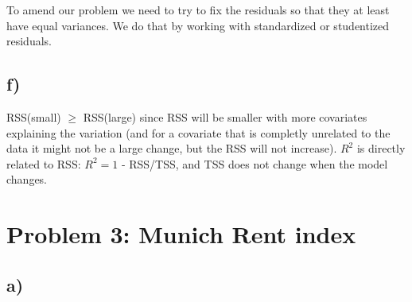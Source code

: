 \documentclass[]{article}
\newenvironment{Shaded}{\begin{snugshade}}{\end{snugshade}}
\newcommand{\KeywordTok}[1]{\textcolor[rgb]{0.13,0.29,0.53}{\textbf{#1}}}
\newcommand{\DataTypeTok}[1]{\textcolor[rgb]{0.13,0.29,0.53}{#1}}
\newcommand{\StringTok}[1]{\textcolor[rgb]{0.31,0.60,0.02}{#1}}
\newcommand{\OperatorTok}[1]{\textcolor[rgb]{0.81,0.36,0.00}{\textbf{#1}}}
\newcommand{\NormalTok}[1]{#1}
\begin{document}
To amend our problem we need to try to fix the residuals so that they at
least have equal variances. We do that by working with standardized or
studentized residuals.

\subsection{f)}\label{f}

RSS(small) \(\geq\) RSS(large) since RSS will be smaller with more
covariates explaining the variation (and for a covariate that is
completly unrelated to the data it might not be a large change, but the
RSS will not increase). \(R^2\) is directly related to RSS: \(R^2 = 1\)
- RSS/TSS, and TSS does not change when the model changes.

\section{Problem 3: Munich Rent
index}\label{problem-3-munich-rent-index}

\subsection{a)}\label{a-1}

\begin{Shaded}
\end{Shaded}
\end{document}
